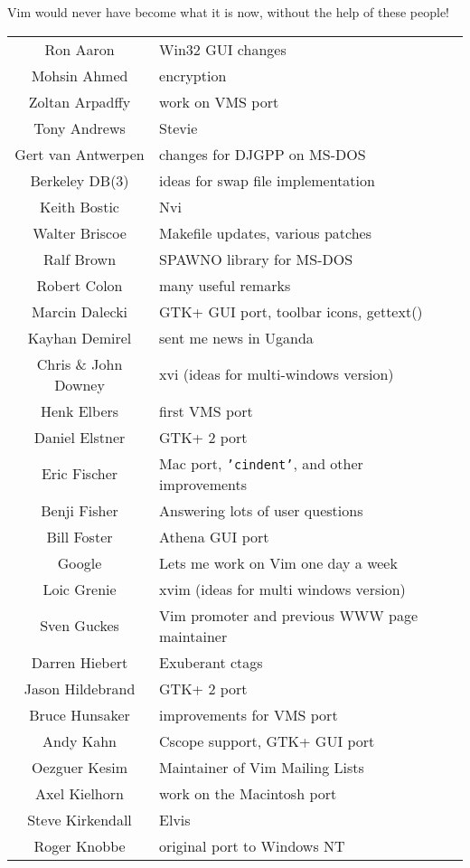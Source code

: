 Vim would never have become what it is now, without the help of these people!
\begin{longtable}{c l}
				Ron Aaron & Win32 GUI changes\\
				Mohsin Ahmed & encryption\\
				Zoltan Arpadffy & work on VMS port\\
				Tony Andrews & Stevie\\
				Gert van Antwerpen & changes for DJGPP on MS-DOS\\
				Berkeley DB(3) & ideas for swap file implementation\\
				Keith Bostic & Nvi\\
				Walter Briscoe & Makefile updates, various patches\\
				Ralf Brown & SPAWNO library for MS-DOS\\
				Robert Colon & many useful remarks\\
				Marcin Dalecki & GTK+ GUI port, toolbar icons, gettext()\\
				Kayhan Demirel & sent me news in Uganda\\
				Chris \& John Downey & xvi (ideas for multi-windows version)\\
				Henk Elbers & first VMS port\\
				Daniel Elstner & GTK+ 2 port\\
				Eric Fischer & Mac port, \texttt{'cindent'}, and other improvements\\
				Benji Fisher & Answering lots of user questions\\
				Bill Foster & Athena GUI port\\
				Google & Lets me work on Vim one day a week\\
				Loic Grenie & xvim (ideas for multi windows version)\\
				Sven Guckes & Vim promoter and previous WWW page maintainer\\
				Darren Hiebert & Exuberant ctags\\
				Jason Hildebrand & GTK+ 2 port\\
				Bruce Hunsaker & improvements for VMS port\\
				Andy Kahn & Cscope support, GTK+ GUI port\\
				Oezguer Kesim & Maintainer of Vim Mailing Lists\\
				Axel Kielhorn & work on the Macintosh port\\
				Steve Kirkendall & Elvis\\
				Roger Knobbe & original port to Windows NT\\

\end{longtable}
